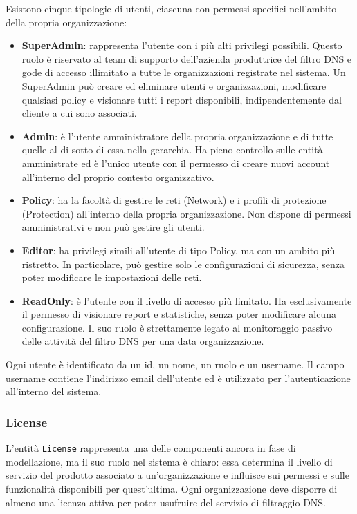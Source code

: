 Esistono cinque tipologie di utenti, ciascuna con permessi specifici nell'ambito della propria organizzazione:
\begin{itemize}
  \item \textbf{SuperAdmin}: rappresenta l'utente con i più alti privilegi possibili. Questo ruolo è riservato al team di supporto dell'azienda produttrice del filtro DNS e gode di accesso illimitato a tutte le organizzazioni registrate nel sistema. Un SuperAdmin può creare ed eliminare utenti e organizzazioni, modificare qualsiasi policy e visionare tutti i report disponibili, indipendentemente dal cliente a cui sono associati.
  \item \textbf{Admin}: è l'utente amministratore della propria organizzazione e di tutte quelle al di sotto di essa nella gerarchia. Ha pieno controllo sulle entità amministrate ed è l'unico utente con il permesso di creare nuovi account all'interno del proprio contesto organizzativo.
  \item \textbf{Policy}: ha la facoltà di gestire le reti (Network) e i profili di protezione (Protection) all'interno della propria organizzazione. Non dispone di permessi amministrativi e non può gestire gli utenti.
  \item \textbf{Editor}: ha privilegi simili all'utente di tipo Policy, ma con un ambito più ristretto. In particolare, può gestire solo le configurazioni di sicurezza, senza poter modificare le impostazioni delle reti.
  \item \textbf{ReadOnly}: è l'utente con il livello di accesso più limitato. Ha esclusivamente il permesso di visionare report e statistiche, senza poter modificare alcuna configurazione. Il suo ruolo è strettamente legato al monitoraggio passivo delle attività del filtro DNS per una data organizzazione.
\end{itemize}

Ogni utente è identificato da un id, un nome, un ruolo e un username. Il campo username contiene l'indirizzo email dell'utente ed è utilizzato per l'autenticazione all'interno del sistema.

\subsubsection{License}
L'entità \texttt{License} rappresenta una delle componenti ancora in fase di modellazione, ma il suo ruolo nel sistema è chiaro: essa determina il livello di servizio del prodotto associato a un'organizzazione e influisce sui permessi e sulle funzionalità disponibili per quest’ultima. Ogni organizzazione deve disporre di almeno una licenza attiva per poter usufruire del servizio di filtraggio DNS.

